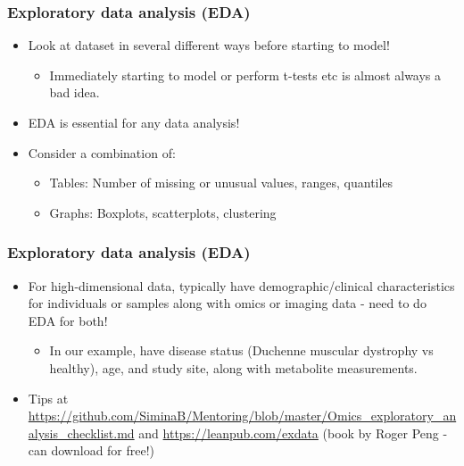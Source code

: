 \documentclass{beamer}
\begin{document}
\begin{frame}
\frametitle{Exploratory data analysis (EDA)}

\begin{itemize}
\item Look at dataset in several different ways before starting to model!
\begin{itemize}
\item Immediately starting to model or perform t-tests etc is almost always a bad idea.
\end{itemize}
\item EDA is essential for any data analysis!
\item Consider a combination of:
\begin{itemize}
\item {\color{orange}Tables}: Number of missing or unusual values, ranges, quantiles
\item {\color{orange}Graphs}: Boxplots, scatterplots, clustering
\end{itemize}

\end{itemize}

\end{frame}


\begin{frame}
\frametitle{Exploratory data analysis (EDA)}

\begin{itemize}
\item For high-dimensional data, typically  have demographic/clinical characteristics for
individuals or samples along with omics or imaging data - need to do EDA for both!
\begin{itemize}
\item {\color{orange}In our example, have disease status (Duchenne muscular dystrophy vs healthy), age, and study site, along with metabolite measurements.}
\end{itemize}
\item Tips at \url{https://github.com/SiminaB/Mentoring/blob/master/Omics_exploratory_analysis_checklist.md}
and \url{https://leanpub.com/exdata} (book by Roger Peng - can download for free!)
\end{itemize}

\end{frame}

\end{document}
